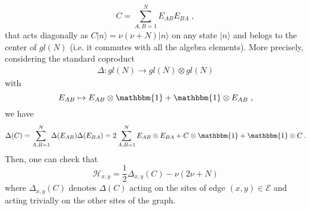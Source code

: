 \documentclass[10pt]{article}
\numberwithin{equation}{section}
\numberwithin{equation}{subsection}
\newcommand{\co}{\;,}
\newcommand{\twoj}{\nu}
\begin{document}
\begin{equation}\label{secondCasimir}
    C=\sum_{A,B=1}^{N}E_{AB}E_{BA}\co
\end{equation}
that acts diagonally as $C|{n}\rangle=\twoj(\twoj+N)|{n}\rangle$ on any state $|n\rangle$ and belogs to the center of ${gl}(N)$ (i.e. it commutes with all the algebra elements).  
More precisely,  considering the standard coproduct 
\begin{equation}
\begin{split}
\Delta:{gl}(N)\to {gl}(N)\otimes {gl}(N)
\end{split}
\end{equation}
with
\begin{equation}
E_{AB}\mapsto E_{AB}\otimes \mathbbm{1}+\mathbbm{1}\otimes E_{AB}\co
\end{equation} 
we have 
\begin{equation}
\Delta(C)=\sum_{A,B=1}^{N}\Delta(E_{AB})\Delta(E_{BA})=2\sum_{A,B=1}^{N}E_{AB}\otimes E_{BA}+C\otimes \mathbbm{1}+\mathbbm{1}\otimes C\,.
\end{equation}
Then, one can check that 
\begin{equation}\label{hamiltonianCasimir}
	\mathcal{H}_{x,y}=\frac{1}{2}\Delta_{x,y}(C)-\twoj(2\twoj+N)
\end{equation}
where $\Delta_{x,y}(C)$ denotes  $\Delta(C)$ acting on  the sites of edge $(x,y)\in \mathcal{E}$ and acting trivially on the other sites of the graph.



 
\end{document}
